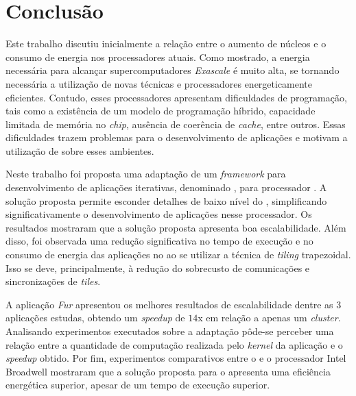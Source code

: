 \chapter{Conclusão}
\label{cha:conclusao}
Este trabalho discutiu inicialmente a relação entre o aumento de núcleos e o consumo de
energia nos processadores atuais. Como mostrado, a energia necessária para alcançar supercomputadores
\textit{Exascale} é muito alta, se tornando necessária a utilização de
novas técnicas e processadores energeticamente eficientes. Contudo, esses
processadores apresentam dificuldades de programação, tais como a existência de
um modelo de programação híbrido, capacidade limitada de memória no
\textit{chip}, ausência de coerência de \textit{cache}, entre outros. Essas
dificuldades trazem problemas para o desenvolvimento
de aplicações e motivam a utilização de \fws sobre esses ambientes.


Neste trabalho foi proposta uma adaptação de um \textit{framework} para
desenvolvimento de aplicações \stencil iterativas, denominado \pskel, para
processador \mppa. A solução proposta permite esconder detalhes de baixo nível
do \mppa, simplificando significativamente o desenvolvimento de aplicações
\stencil nesse processador. Os resultados mostraram que a solução proposta
apresenta boa escalabilidade. Além disso, foi observada uma redução
significativa no tempo de execução e no consumo de energia das aplicações no
\mppa ao se utilizar a técnica de \textit{tiling} trapezoidal. Isso se deve,
principalmente, à redução do sobrecusto de comunicações e sincronizações de
\textit{tiles}.

A aplicação \textit{Fur} apresentou os melhores resultados de escalabilidade
dentre as 3 aplicações estudas, obtendo um \textit{speedup} de $14$x em relação
a apenas um \textit{cluster}. Analisando experimentos executados sobre a
adaptação pôde-se perceber uma relação entre a quantidade de computação
realizada pelo \textit{kernel} da aplicação e o \textit{speedup} obtido. Por
fim, experimentos comparativos entre o \mppa e o processador Intel Broadwell
mostraram que a solução proposta para o \mppa apresenta uma eficiência
energética superior, apesar de um tempo de execução superior.

